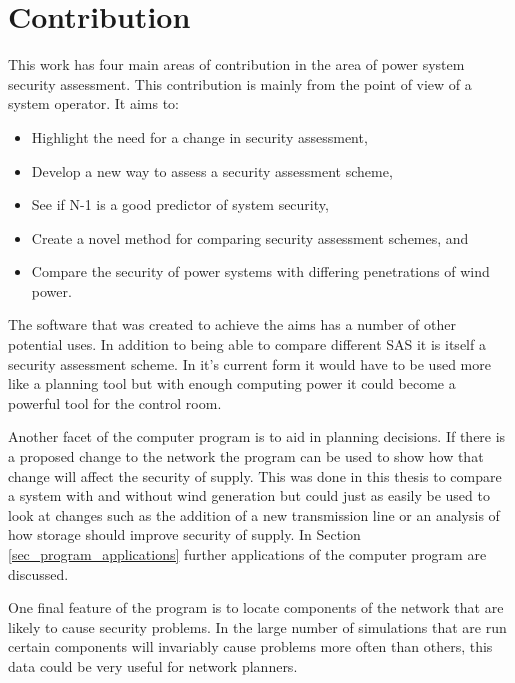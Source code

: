 \documentclass[a4paper,oneside,12pt]{report}
\newenvironment{vivacorrections}
{}
{}
\begin{document}
\section{Contribution}

This work has four main areas of contribution in the area of power system security assessment. This contribution is mainly from the point of view of a system operator. It aims to:

\begin{itemize}
\item Highlight the need for a change in security assessment,
\item Develop a new way to assess a security assessment scheme,
\item See if N-1 is a good predictor of system security,
\item Create a novel method for comparing security assessment schemes, and
\item Compare the security of power systems with differing penetrations of wind power.
\end{itemize}

\begin{vivacorrections}

The software that was created to achieve the aims has a number of other potential uses. In addition to being able to compare different SAS it is itself a security assessment scheme. In it's current form it would have to be used more like a planning tool but with enough computing power it could become a powerful tool for the control room. 

Another facet of the computer program is to aid in planning decisions. If there is a proposed change to the network the program can be used to show how that change will affect the security of supply. This was done in this thesis to compare a system with and without wind generation but could just as easily be used to look at changes such as the addition of a new transmission line or an analysis of how storage should improve security of supply. In Section \ref{sec_program_applications} further applications of the computer program are discussed. 

One final feature of the program is to locate components of the network that are likely to cause security problems. In the large number of simulations that are run certain components will invariably cause problems more often than others, this data could be very useful for network planners. 

\end{vivacorrections}
\end{document}
